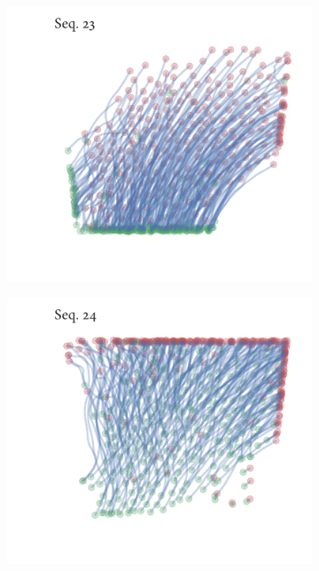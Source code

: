 \begin{figure}[h]
\begin{subfigure}[t]{0.5\textwidth}
		\includegraphics{streamline_sequence23.pdf}
	\end{subfigure}%
	\begin{subfigure}[t]{0.5\textwidth}
		\centering
		\includegraphics{streamline_sequence24.pdf}
	\end{subfigure}
\end{figure}
